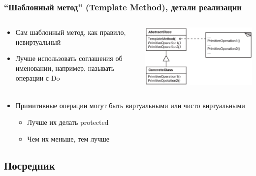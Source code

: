\documentclass[xetex,mathserif,serif]{beamer}
\begin{document}
    \begin{frame}
        \frametitle{``Шаблонный метод'' (Template Method), детали реализации}
        \begin{columns}
            \begin{column}{0.5\textwidth}
                \begin{itemize}
                    \item Сам шаблонный метод, как правило, невиртуальный
                    \item Лучше использовать соглашения об именовании, например, называть операции с Do
                \end{itemize}
            \end{column}
            \begin{column}{0.4\textwidth}
                \begin{center}
                    \includegraphics[width=\textwidth]{templateMethod.png}
                \end{center}
            \end{column}
        \end{columns}
        \begin{itemize}
            \item Примитивные операции могут быть виртуальными или чисто виртуальными
            \begin{itemize}
                \item Лучше их делать protected
                \item Чем их меньше, тем лучше
            \end{itemize}
        \end{itemize}
    \end{frame}

    \subsection{Посредник}
\end{document}
